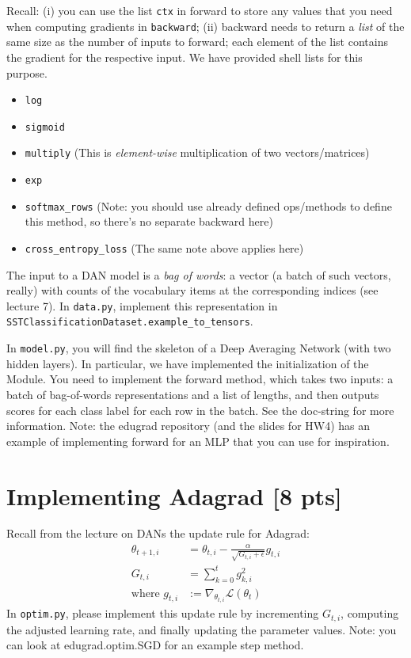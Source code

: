 \documentclass[11pt]{article}
\begin{document}
Recall: (i) you can use the list \texttt{ctx} in forward to store any values that you need when computing gradients in \texttt{backward}; (ii) backward needs to return a \emph{list} of the same size as the number of inputs to forward; each element of the list contains the gradient for the respective input.  We have provided shell lists for this purpose.
\begin{itemize}
  \item \texttt{log}
  \item \texttt{sigmoid}
  \item \texttt{multiply} (This is \emph{element-wise} multiplication of two vectors/matrices)
  \item \texttt{exp}
  \item \texttt{softmax\_rows} (Note: you should use already defined ops/methods to define this method, so there's no separate backward here)
  \item \texttt{cross\_entropy\_loss} (The same note above applies here)
\end{itemize}

\vspace{2em}
  The input to a DAN model is a \emph{bag of words}: a vector (a batch of such vectors, really) with counts of the vocabulary items at the corresponding indices (see lecture 7). In \texttt{data.py}, implement this representation in \texttt{SSTClassificationDataset.example\_to\_tensors}.

\vspace{2em}
  In \texttt{model.py}, you will find the skeleton of a Deep Averaging Network (with two hidden layers).  In particular, we have implemented the initialization of the Module.  You need to implement the forward method, which takes two inputs: a batch of bag-of-words representations and a list of lengths, and then outputs scores for each class label for each row in the batch.  See the doc-string for more information.  Note: the edugrad repository (and the slides for HW4) has an example of implementing forward for an MLP that you can use for inspiration.

\section{Implementing Adagrad [8 pts]}

Recall from the lecture on DANs the update rule for Adagrad:
\begin{align*}
  \theta_{t+1, i} &= \theta_{t, i} - \frac{\alpha}{\sqrt{G_{t, i} + \epsilon}} g_{t, i}
  \\
  G_{t, i} &= \sum_{k=0}^t g_{k, i}^2
  \\
  \text{where } g_{t, i} &:= \nabla_{\theta_{t,i}} \mathcal{L}(\theta_t)
\end{align*}
In \texttt{optim.py}, please implement this update rule by incrementing $G_{t, i}$, computing the adjusted learning rate, and finally updating the parameter values.  Note: you can look at edugrad.optim.SGD for an example step method.
\end{document}
